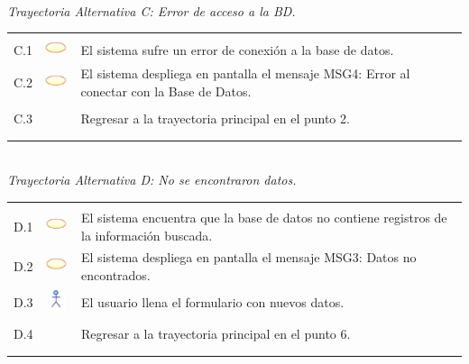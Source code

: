 \documentclass[10pt,spanish]{article}
\providecommand{\tabularnewline}{\\}
\begin{document}
\textit{\large \\Trayectoria Alternativa C: Error de acceso a la BD.}

\begin{tabular}{ccl}
	& & \tabularnewline
	
	C.1 & \includegraphics{sistema} & El sistema sufre un error de conexión a la base de datos.\tabularnewline
		
	C.2 & \includegraphics{sistema} & El sistema despliega en pantalla el mensaje MSG4: Error al conectar con la Base de Datos. 	\tabularnewline	\tabularnewline	
		
	C.3 & & Regresar a la trayectoria principal en el punto 2.\tabularnewline

	
	\tabularnewline\tabularnewline	
	\end{tabular}

\newpage
\textit{\large \\Trayectoria Alternativa D: No se encontraron datos.}

\begin{tabular}{ccl}
	& & \tabularnewline
	
	D.1 & \includegraphics{sistema} & El sistema encuentra que la base de datos no contiene registros de la información buscada.\tabularnewline
		
	D.2 & \includegraphics{sistema} & El sistema despliega en pantalla el mensaje MSG3: Datos no encontrados. 	\tabularnewline	
	
	D.3 & \includegraphics{actor} & El usuario llena el formulario con nuevos datos. 	\tabularnewline	\tabularnewline	
		
	D.4 & & Regresar a la trayectoria principal en el punto 6.\tabularnewline

	
	\tabularnewline\tabularnewline	
	\end{tabular}
\end{document}
